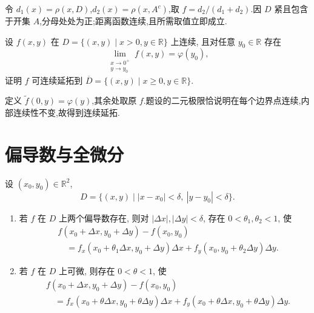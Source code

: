 \begin{solution}
    令 $d_1(x)=\rho(x,D)$,$d_2(x)=\rho(x,A^c)$,取 $f=d_2/(d_1+d_2)$.因 $D$ 紧且包含于开集 $A$,分母处处为正;距离函数连续,且所需取值立即成立.
\end{solution}

\begin{example}
    设 $f(x,y)$ 在 $D=\{(x,y)\mid x>0,y\in\mathbb{R}\}$ 上连续, 且对任意 $y_0\in\mathbb{R}$ 存在
    \[
        \displaystyle\lim\limits_{\substack{x\to0^+\\y\to y_0}}f(x,y)=\varphi(y_0),
    \]
    证明 $f$ 可连续延拓到 $\overline D=\{(x,y)\mid x\geq0,y\in\mathbb{R}\}$.
\end{example}
\exampleblank

\begin{solution}
    定义 $\widetilde f(0,y)=\varphi(y)$,其余处取原 $f$.题设的二元极限恰说明在每个边界点连续,内部连续性不变,故得到连续延拓.
\end{solution}


\newpage

\section{偏导数与全微分}

\begin{theorem}
    设 $(x_0,y_0)\in\mathbb{R}^2$,
    \[
        D=\{(x,y)\mid |x-x_0|<\delta,\ |y-y_0|<\delta\}.
    \]
    \begin{enumerate}
        \item 若 $f$ 在 $D$ 上两个偏导数存在, 则对 $|\Delta x|,|\Delta y|<\delta$, 存在 $0<\theta_1,\theta_2<1$, 使
              \[
                  \begin{aligned}
                       & f(x_0+\Delta x,y_0+\Delta y)-f(x_0,y_0)              \\
                       & \quad=f_x(x_0+\theta_1\Delta x,y_0+\Delta y)\Delta x
                      +f_y(x_0,y_0+\theta_2\Delta y)\Delta y.
                  \end{aligned}
              \]
        \item 若 $f$ 在 $D$ 上可微, 则存在 $0<\theta<1$, 使
              \[
                  \begin{aligned}
                       & f(x_0+\Delta x,y_0+\Delta y)-f(x_0,y_0)                  \\
                       & \quad=f_x(x_0+\theta\Delta x,y_0+\theta\Delta y)\Delta x
                      +f_y(x_0+\theta\Delta x,y_0+\theta\Delta y)\Delta y.
                  \end{aligned}
              \]
    \end{enumerate}
\end{theorem}



